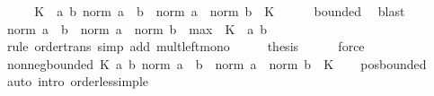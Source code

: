 \begin{isabellebody}
%
\isadelimproof
%
\endisadelimproof
%
\isatagproof
{}\isamarkupfalse%
\ {\isacharminus}{\kern0pt}\isanewline
\ \ \isamarkupfalse%
\ K\ \ {\isachardoublequoteopen}{\isasymAnd}a\ b{\isachardot}{\kern0pt}\ norm\ {\isacharparenleft}{\kern0pt}a\ {\isacharasterisk}{\kern0pt}{\isacharasterisk}{\kern0pt}\ b{\isacharparenright}{\kern0pt}\ {\isasymle}\ norm\ a\ {\isacharasterisk}{\kern0pt}\ norm\ b\ {\isacharasterisk}{\kern0pt}\ K{\isachardoublequoteclose}\isanewline
\ \ \ \ \isamarkupfalse%
\ bounded\ \isamarkupfalse%
\ blast\isanewline
\ \ \isamarkupfalse%
\ \isamarkupfalse%
\ {\isachardoublequoteopen}norm\ {\isacharparenleft}{\kern0pt}a\ {\isacharasterisk}{\kern0pt}{\isacharasterisk}{\kern0pt}\ b{\isacharparenright}{\kern0pt}\ {\isasymle}\ norm\ a\ {\isacharasterisk}{\kern0pt}\ norm\ b\ {\isacharasterisk}{\kern0pt}\ {\isacharparenleft}{\kern0pt}max\ {}\ K{\isacharparenright}{\kern0pt}{\isachardoublequoteclose}\ \ a\ b\isanewline
\ \ \ \ \isamarkupfalse%
\ {\isacharparenleft}{\kern0pt}rule\ order{\isachardot}{\kern0pt}trans{\isacharparenright}{\kern0pt}\ {\isacharparenleft}{\kern0pt}simp\ add{\isacharcolon}{\kern0pt}\ mult{\isacharunderscore}{\kern0pt}left{\isacharunderscore}{\kern0pt}mono{\isacharparenright}{\kern0pt}\isanewline
\ \ \isamarkupfalse%
\ \isamarkupfalse%
\ {\isacharquery}{\kern0pt}thesis\isanewline
\ \ \ \ \isamarkupfalse%
\ force\isanewline
{}\isamarkupfalse%
%
\endisatagproof
{\isafoldproof}%
%
\isadelimproof
\isanewline
%
\endisadelimproof
\isanewline
{}\isamarkupfalse%
\ nonneg{\isacharunderscore}{\kern0pt}bounded{\isacharcolon}{\kern0pt}\ {\isachardoublequoteopen}{\isasymexists}K{\isasymge}{}{\isachardot}{\kern0pt}\ {\isasymforall}a\ b{\isachardot}{\kern0pt}\ norm\ {\isacharparenleft}{\kern0pt}a\ {\isacharasterisk}{\kern0pt}{\isacharasterisk}{\kern0pt}\ b{\isacharparenright}{\kern0pt}\ {\isasymle}\ norm\ a\ {\isacharasterisk}{\kern0pt}\ norm\ b\ {\isacharasterisk}{\kern0pt}\ K{\isachardoublequoteclose}\isanewline
%
\isadelimproof
\ \ %
\endisadelimproof
%
\isatagproof
{}\isamarkupfalse%
\ pos{\isacharunderscore}{\kern0pt}bounded\ \isamarkupfalse%
\ {\isacharparenleft}{\kern0pt}auto\ intro{\isacharcolon}{\kern0pt}\ order{\isacharunderscore}{\kern0pt}less{\isacharunderscore}{\kern0pt}imp{\isacharunderscore}{\kern0pt}le{\isacharparenright}{\kern0pt}%
\endisatagproof

\end{isabellebody}
